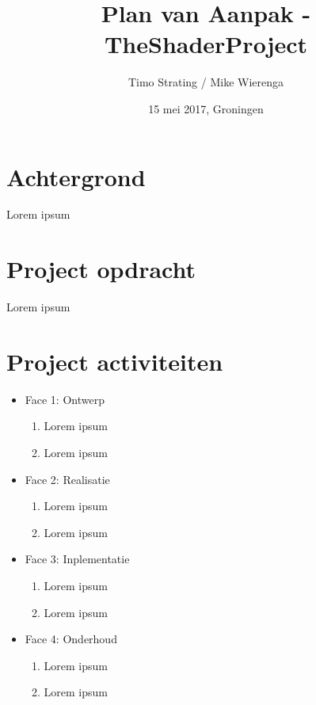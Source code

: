 \documentclass[]{report}
\title{Plan van Aanpak - TheShaderProject}
\author{Timo Strating / Mike Wierenga}
\date{15 mei 2017, Groningen}
\begin{document}
\maketitle

\tableofcontents
\newpage






\chapter{Achtergrond}

Lorem ipsum



\chapter{Project opdracht}

Lorem ipsum




\chapter{Project activiteiten}

\begin{itemize}
	\item Face 1: Ontwerp
	\begin{enumerate}
		\item Lorem ipsum
		\item Lorem ipsum
			\newline
	\end{enumerate} 
	
	\item Face 2: Realisatie
	\begin{enumerate}
		\item Lorem ipsum
		\item Lorem ipsum
			\newline
	\end{enumerate} 
	
	\item Face 3: Inplementatie
	\begin{enumerate}
		\item Lorem ipsum
		\item Lorem ipsum
		\newline
	\end{enumerate}

	\item Face 4: Onderhoud
	\begin{enumerate}
		\item Lorem ipsum
		\item Lorem ipsum
		\newline
	\end{enumerate}
\end{itemize} 
\end{document}
